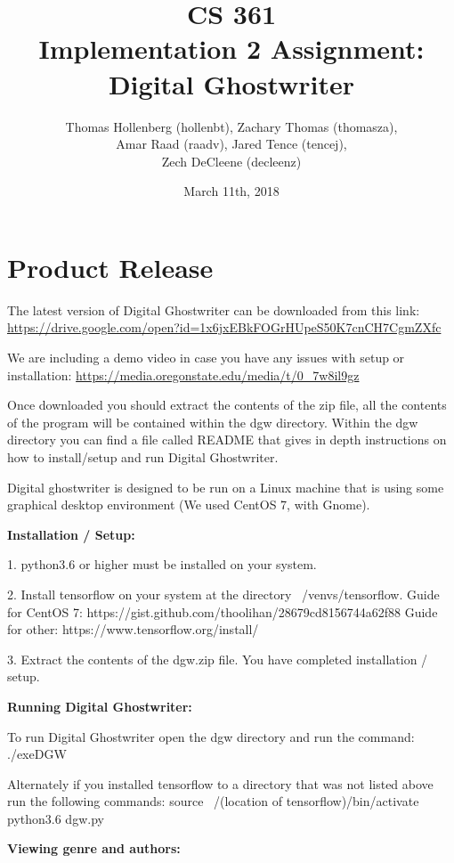 \documentclass[12pt]{article}
\title{CS 361 \\ Implementation 2 Assignment: \\ Digital Ghostwriter}
\author{Thomas Hollenberg (hollenbt), Zachary Thomas (thomasza),\\ Amar Raad (raadv), Jared Tence (tencej), \\  Zech DeCleene (decleenz)}
\date{March 11th, 2018}
\begin{document}
\maketitle
\newpage
\tableofcontents

\newpage

\section{Product Release}

The latest version of Digital Ghostwriter can be downloaded from this link:\newline
\url{https://drive.google.com/open?id=1x6jxEBkFOGrHUpeS50K7cnCH7CgmZXfc}

We are including a demo video in case you have any issues with setup or installation:\newline
\url{https://media.oregonstate.edu/media/t/0_7w8il9gz}

Once downloaded you should extract the contents of the zip file, all the contents of the program will be contained within the dgw directory.
Within the dgw directory you can find a file called README that gives in depth instructions on how to install/setup and run Digital Ghostwriter. 

Digital ghostwriter is designed to be run on a Linux machine that is using some graphical desktop environment (We used CentOS 7, with Gnome).

\textbf{Installation / Setup:}

1. python3.6 or higher must be installed on your system.

2. Install tensorflow on your system at the directory ~/venvs/tensorflow.
Guide for CentOS 7: https://gist.github.com/thoolihan/28679cd8156744a62f88
Guide for other: https://www.tensorflow.org/install/

3. Extract the contents of the dgw.zip file. You have completed installation / setup.

\textbf{Running Digital Ghostwriter:}

To run Digital Ghostwriter open the dgw directory and run the command: ./exeDGW

Alternately if you installed tensorflow to a directory that was not listed above run the following commands: \newline
source ~/(location of tensorflow)/bin/activate \newline
python3.6 dgw.py

\newpage
\textbf{Viewing genre and authors:}
\end{document}
